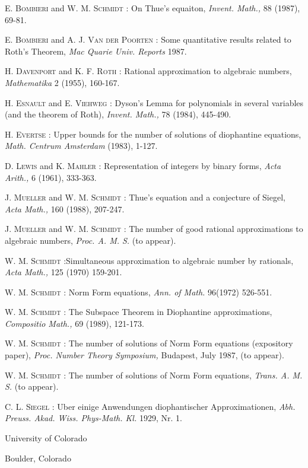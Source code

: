 \begin{thebibliography}{99}
 \textsc{E. Bombieri} and \textsc{W. M. Schmidt :} On Thue's equaiton, {\em Invent. Math.,} 88 (1987), 69-81.

 \textsc{E. Bombieri} and \textsc{A. J. Van der Poorten :} Some quantitative results related to Roth's Theorem, {\em Mac Quarie Univ. Reports} 1987.

 \textsc{H. Davenport} and \textsc{K. F. Roth :} Rational approximation to algebraic numbers, {\em Mathematika} 2 (1955), 160-167.

 \textsc{H. Esnault} and \textsc{E. Viehweg : } Dyson's Lemma for polynomials in several variables (and the theorem of Roth), {\em Invent. Math.,} 78 (1984), 445-490.

 \textsc{H. Evertse :} Upper bounds for the number of solutions of diophantine equations, {\em Math. Centrum Amsterdam} (1983), 1-127.

 \textsc{D. Lewis} and \textsc{K. Mahler :} Representation of integers by binary forms, {\em Acta Arith.,} 6 (1961), 333-363.

 \textsc{J. Mueller} and \textsc{W. M. Schmidt :} Thue's equation and a conjecture of Siegel, {\em Acta Math.,} 160 (1988), 207-247.

 \textsc{J. Mueller} and \textsc{W. M. Schmidt :} The number of good rational approximations to algebraic numbers, {\em Proc. A. M. S.} (to appear).

 \textsc{W. M. Schmidt :}\pageoriginale Simultaneous approximation to algebraic number by rationals, {\em Acta Math.,} 125 (1970) 159-201.

 \textsc{W. M. Schmidt :} Norm Form equations, {\em Ann. of Math.} 96(1972) 526-551.

 \textsc{W. M. Schmidt :} The Subspace Theorem in Diophantine approximations, {\em Compositio Math.,} 69 (1989), 121-173.

 \textsc{W. M. Schmidt :} The number of solutions of Norm Form equations (expository paper), {\em Proc. Number Theory Symposium,} Budapest, July 1987, (to appear).

 \textsc{W. M. Schmidt :} The number of solutions of Norm Form equations, {\em Trans. A. M. S.} (to appear).

 \textsc{C. L. Siegel :} Uber einige Anwendungen diophantischer Approximationen, {\em Abh. Preuss. Akad. Wiss. Phys-Math. Kl.} 1929, Nr. 1.
\end{thebibliography}

\bigskip
\noindent
{\small University of Colorado}

\noindent
{\small Boulder, Colorado}


